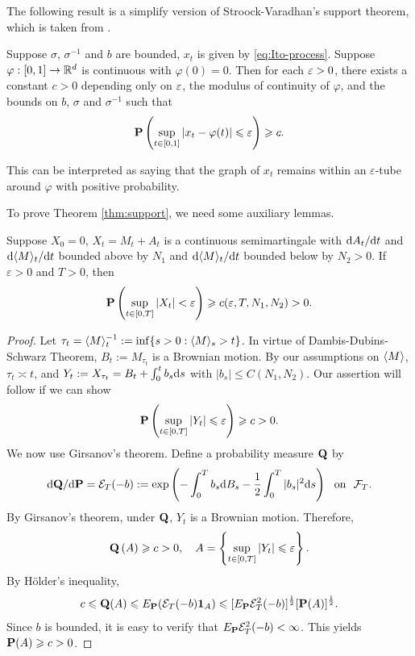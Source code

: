 The following result is a simplify version of Stroock-Varadhan's support theorem, which is taken from \cite{bass1998diffusions}. 
	\begin{theorem}
		Suppose $\sigma$, $\sigma^{-1}$ and $b$ are bounded, $x_t$ is given by \eqref{eq:Ito-process}. Suppose $\varphi: [0,1]\to {\mathbb R}^d$ is continuous with $\varphi(0)=0$. Then for each $\varepsilon>0$, there exists a constant $c>0$ depending only on $\varepsilon$, the modulus of continuity of $\varphi$, and the bounds on $b$, $\sigma$ and $\sigma^{-1}$ such that 
		\begin{equation}\label{Eq-support}
			{\mathbf P}\left(\sup_{t\in [0,1]}|x_t-\varphi(t)|\leqslant \varepsilon\right)\geqslant c. 
		\end{equation}
	\end{theorem}\label{thm:support}
	This can be interpreted as saying that the graph of \(x_t\) remains within an \(\varepsilon\)-tube around \(\varphi\) with positive probability.

\medskip

To prove Theorem \ref{thm:support}, we need some  auxiliary lemmas. 

\begin{lemma}\label{lem:support-mart}
    Suppose $X_0=0$, $X_t=M_t+A_t$ is a continuous semimartingale with $\text{\rm{d}} A_t / \text{\rm{d}} t$ and $\text{\rm{d}}\langle M\rangle_t / \text{\rm{d}} t$ bounded above by $N_1$ and $\text{\rm{d}}\langle M\rangle_t / \text{\rm{d}} t$ bounded below by $N_2>0$. If $\varepsilon>0$ and $T>0$, then
    \[
    {\mathbf P} \left(\sup _{t\in [0,T]}\left|X_t\right|<\varepsilon\right) \geqslant c(\varepsilon, T, N_1, N_2)>0.
    \]
\end{lemma}
\begin{proof}
    Let $\tau_t=\langle M\rangle^{-1}_t:=\inf\{s>0: \langle M\rangle_s>t\}$. In virtue of Dambis-Dubins-Schwarz Theorem, $B_{t}:=M_{\tau_t}$ is a Brownian motion. By our assumptions on \(\langle M\rangle\), $\tau_t\asymp t$, and $Y_t:= X_{\tau_t}=B_t+ \int_0^t b_s \text{\rm{d}} s$ with $|b_s|\leq C(N_1, N_2)$. Our assertion will follow if we can show 
    \[
        {\mathbf P} \left( \sup_{t\in [0,T]} |Y_t| \leqslant \varepsilon \right)\geqslant c>0. 
    \]
    We now use Girsanov’s theorem. Define a probability measure ${\mathbf Q}$ by 
    \[
        \text{\rm{d}} {\mathbf Q}/ \text{\rm{d}} {\mathbf P} = {\mathcal E}_T(-b):= \exp \left( - \int_0^T b_s \text{\rm{d}} B_s-\frac{1}{2} \int_0^T |b_s|^2 \text{\rm{d}} s \right) ~\mbox{ on } ~ {\mathcal F}_{T}. 
    \]
    By Girsanov’s theorem, under ${\mathbf Q}$, $Y_t$ is a Brownian motion. Therefore, 
    \[
        {\mathbf Q} \left( A \right)\geqslant c>0, \quad A= \left\{\sup_{t\in [0,T]} |Y_t| \leqslant \varepsilon\right\}.  
    \]
    By Hölder's inequality, 
    \[
        c\leqslant {\mathbf Q}(A) \leqslant E_{{\mathbf P}} ({\mathcal E}_T(-b) {\mathbf{1}}_A)\leqslant  [E_{{\mathbf P}} {\mathcal E}_T^2(-b)]^{\frac{1}{2}} [{\mathbf P}(A)]^{\frac{1}{2}}.
    \]
    Since $b$ is bounded, it is easy to verify that $E_{{\mathbf P}} {\mathcal E}_T^2(-b)<\infty$. This yields ${\mathbf P}(A)\geqslant c>0$. 
\end{proof}
	
